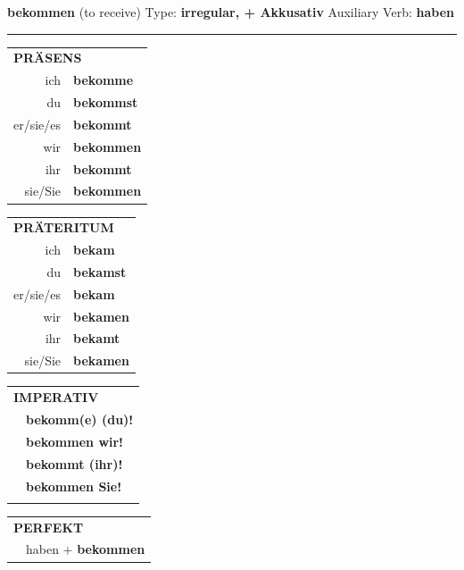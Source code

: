 \documentclass[10pt,a4paper]{revtex4-2}
\begin{document}
\begin{verbbox-acc}
    {\Large \bf bekommen} (to receive) \hfill Type: \textbf{irregular, + Akkusativ} \hfill Auxiliary Verb: \textbf{haben} 
    
     \vspace{5pt}

    \hrule
    
    \vspace{5pt}

  \begin{tabular}{rl}
     \multicolumn{2}{l}{\textbf{PRÄSENS} }\\
    ich & \textbf{bekomme}\\
    du & \textbf{bekommst}\\
    er/sie/es & \textbf{bekommt}\\
    wir & \textbf{bekommen}\\
    ihr & \textbf{bekommt}\\
    sie/Sie & \textbf{bekommen}\\
  \end{tabular}
  \hfill
     \begin{tabular}{rl}
    \multicolumn{2}{l}{\textbf{PRÄTERITUM} }\\
    ich & \textbf{bekam}\\
    du & \textbf{bekamst}\\
    er/sie/es & \textbf{bekam}\\
    wir & \textbf{bekamen}\\
    ihr & \textbf{bekamt}\\
    sie/Sie & \textbf{bekamen}\\
  \end{tabular}
  \hfill
  \begin{tabular}{rl}
     \multicolumn{2}{l}{\textbf{IMPERATIV} }\\
   & \textbf{bekomm(e) (du)!}\\
   & \textbf{bekommen wir!}\\
   & \textbf{bekommt (ihr)!}\\
   & \textbf{bekommen Sie!}\\
   & \vspace{10pt}
  \end{tabular}

    \vspace{10pt}

 \begin{tabular}{rl}
     \multicolumn{2}{l}{\textbf{PERFEKT}}\\
  &  haben + \textbf{bekommen}\\
  \end{tabular}
\hfill
   \begin{tabular}{rl}
   

\end{tabular}
\end{verbbox-acc}
\end{document}
